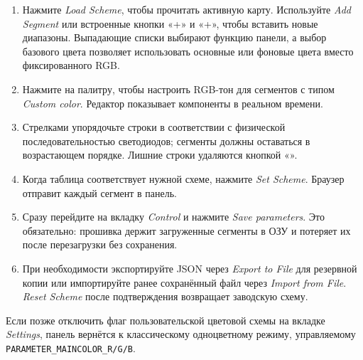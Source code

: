 \begin{enumerate}
    \item Нажмите \emph{Load Scheme}, чтобы прочитать активную карту. Используйте \emph{Add Segment} или встроенные кнопки «+\textuparrow{}» и «+\textdownarrow{}», чтобы вставить новые диапазоны. Выпадающие списки выбирают функцию панели, а выбор базового цвета позволяет использовать основные или фоновые цвета вместо фиксированного RGB.
    \item Нажмите на палитру, чтобы настроить RGB-тон для сегментов с типом \emph{Custom color}. Редактор показывает компоненты в реальном времени.
    \item Стрелками упорядочьте строки в соответствии с физической последовательностью светодиодов; сегменты должны оставаться в возрастающем порядке. Лишние строки удаляются кнопкой «\texttimes{}».
    \item Когда таблица соответствует нужной схеме, нажмите \emph{Set Scheme}. Браузер отправит каждый сегмент в панель.
    \item Сразу перейдите на вкладку \emph{Control} и нажмите \emph{Save parameters}. Это обязательно: прошивка держит загруженные сегменты в ОЗУ и потеряет их после перезагрузки без сохранения.
    \item При необходимости экспортируйте JSON через \emph{Export to File} для резервной копии или импортируйте ранее сохранённый файл через \emph{Import from File}. \emph{Reset Scheme} после подтверждения возвращает заводскую схему.
\end{enumerate}

Если позже отключить флаг пользовательской цветовой схемы на вкладке \emph{Settings}, панель вернётся к классическому одноцветному режиму, управляемому \verb|PARAMETER_MAINCOLOR_R/G/B|.
